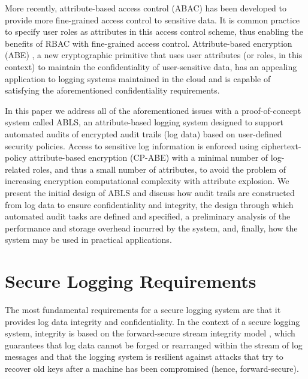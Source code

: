 \documentclass{sig-alternate}
\begin{document}
More recently, attribute-based access control (ABAC) \cite{shen2006attribute} \cite{alipour2011policy} 
\cite{zhu2008attribute} has been developed to provide more fine-grained access control to sensitive data. 
It is common practice to specify user roles as attributes
in this access control scheme, thus enabling the benefits of RBAC with fine-grained access control.
Attribute-based encryption (ABE) \cite{Goyal2006-ABAC}, a new cryptographic primitive that uses 
user attributes (or roles, in this context) to maintain the confidentiality of user-sensitive data, has an appealing application
to logging systems maintained in the cloud and is capable of satisfying the aforementioned confidentiality 
requirements. 

In this paper we address all of the aforementioned issues with a proof-of-concept system called ABLS, 
an attribute-based logging system designed
to support automated audits of encrypted audit trails (log data) based on user-defined security policies. Access to
sensitive log information is enforced using ciphertext-policy attribute-based encryption (CP-ABE) 
\cite{Bethencourt2007-CPABE} with a minimal number
of log-related roles, and thus a small number of attributes, to avoid the problem of increasing encryption computational
complexity with attribute explosion. We present the initial design of ABLS and discuss how audit trails are 
constructed from log data to ensure confidentiality and integrity, the design through which automated audit tasks are 
defined and specified, a preliminary analysis of the performance and storage overhead incurred by the system, and, finally,  
how the system may be used in practical applications.


\section{Secure Logging Requirements}
The most fundamental requirements for a secure logging system are that it provides log data integrity
and confidentiality. In the context of a secure logging system, integrity is based on the forward-secure
stream integrity model \cite{Bellare1997-ForwardIntegrity}, which guarantees that log data cannot be forged or rearranged 
within the stream of log messages and that the logging system is resilient against attacks that try to recover old keys after a 
machine has been compromised (hence, forward-secure).
\end{document}
